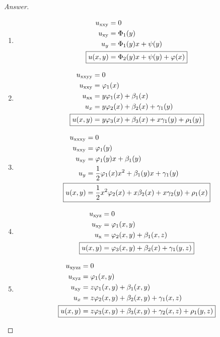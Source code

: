 \documentclass{article}
\theoremstyle{definition}
\renewcommand\qedsymbol{$\blacksquare$}
\newenvironment{ans}{\begin{proof}[Answer]\renewcommand{\qedsymbol}{}}{\end{proof}}
\begin{document}
	\begin{ans}
		\begin{enumerate}[resume*=answers]
			\item \begin{align*}
				u_{\mathrm{xxy}} &= 0\\
				u_{\mathrm{xy}} &= \Phi_1(y)\\
				u_y &= \Phi_1(y)x + \psi(y) \\
				\Aboxed{u(x,y) &= \Phi_2(y)x + \psi(y) + \varphi(x)}
			\end{align*}
			
			
			\item \begin{align*}
				u_{\mathrm{xxyy}} &= 0\\
				u_{\mathrm{xxy}} &= \varphi_1(x) \\
				u_{\mathrm{xx}} &= y\varphi_1(x) + \beta_1(x) \\
				u_x &= y\varphi_2(x) + \beta_2(x) + \gamma_1(y) \\
				\Aboxed{u(x, y) &= y\varphi_3(x) + \beta_3(x) + x\gamma_1(y) + \rho_1(y)}
			\end{align*}
				
				\item \begin{align*}
				u_{\mathrm{xxxy}} &= 0 \\
				u_{\mathrm{xxy}} &= \varphi_1(y)\\ 
				u_{\mathrm{xy}} &= \varphi_1(y)x + \beta_1(y) \\
				u_y &= \frac{1}{2}\varphi_1(x)x^2 + \beta_1(y)x + \gamma_1(y) 	
				\\ \Aboxed{u(x, y) &= \frac{1}{2}x^2\varphi_2(x) + x\beta_2(x) + x\gamma_2(y) + \rho_1(x)}
			\end{align*}
				
				\item \begin{align*}
					u_{\mathrm{xyz}} &= 0 
					\\ u_{\mathrm{xy}} &= \varphi_1(x, y) 
					\\ u_{\mathrm{x}} &= \varphi_2(x, y) + \beta_1(x, z)	
					\\ \Aboxed{u(x, y) &= \varphi_3(x, y) + \beta_2(x) + \gamma_1(y,z)}
				\end{align*}
				
				\item \begin{align*}
					u_{\mathrm{xyzz}} &= 0 
					\\ u_{\mathrm{xyz}} &= \varphi_1(x, y) 
					\\ u_{\mathrm{xy}} &= z\varphi_1(x, y) + \beta_1(x, y)	
					\\ u_x &= z\varphi_2(x, y) + \beta_2(x, y)	+ \gamma_1(x, z)
					\\ \Aboxed{u(x, y) &= z\varphi_3(x, y) + \beta_3(x, y) + \gamma_2(x,z) + \rho_1(y, z)}
				\end{align*}
				

\end{enumerate}
\end{ans}
\end{document}
